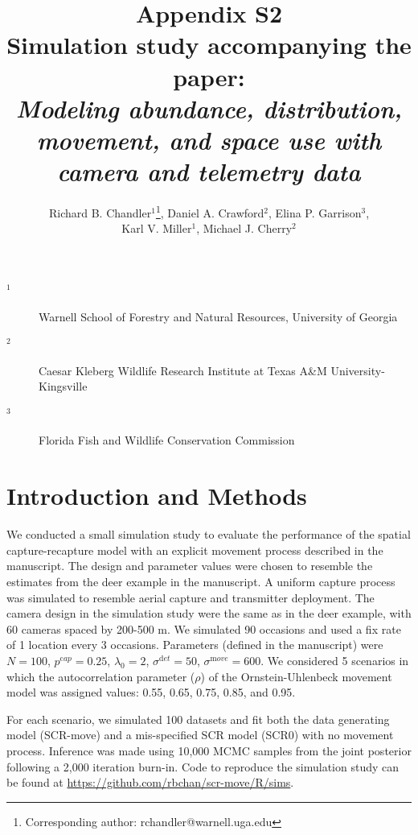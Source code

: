 \documentclass[12pt]{article}
\title{Appendix S2 \\ Simulation study accompanying the paper: \\ \it Modeling abundance, distribution, movement, and space
  use with camera and telemetry data}
\author{Richard B. Chandler$^1$\footnote{Corresponding author: rchandler@warnell.uga.edu}, Daniel A. Crawford$^2$, Elina P. Garrison$^3$, \\
  Karl V. Miller$^1$, Michael J. Cherry$^2$}
\begin{document}
\maketitle

\vspace{12pt}

\begin{description}%
\item[$^1$] Warnell School of Forestry and Natural Resources, University of Georgia %
\item[$^2$] Caesar Kleberg Wildlife Research Institute at Texas A\&M University-Kingsville %
\item[$^3$] Florida Fish and Wildlife Conservation Commission %
\end{description}

\clearpage

\section*{Introduction and Methods}

We conducted a small simulation study to evaluate the performance of the
spatial capture-recapture model with an explicit movement process
described in the manuscript.
The design and parameter values were chosen to resemble the estimates
from the deer example in the manuscript. A uniform capture process was
simulated to resemble aerial capture and transmitter
deployment. The camera design in the simulation study were the same as
in the deer example, with 60 cameras spaced by 200-500 m. We simulated
90 occasions and used a fix rate of 1 location every 3
occasions. Parameters (defined in the manuscript) were $N=100$,
$p^{\mathrm cap}=0.25$, $\lambda_0=2$, $\sigma^{\mathrm det}=50$,
$\sigma^{\mathrm move}=600$. We 
considered 5 scenarios in which the autocorrelation parameter ($\rho$)
of the Ornstein-Uhlenbeck movement model was assigned values: 0.55,
0.65, 0.75, 0.85, and 0.95. 

For each scenario, we simulated 100 datasets and fit both
the data generating model (SCR-move) and a mis-specified SCR model
(SCR0) with no movement process. Inference was made using 10,000 MCMC
samples from the joint posterior following a 2,000 iteration
burn-in. Code to reproduce the simulation study can be found at
\url{https://github.com/rbchan/scr-move/R/sims}.
\end{document}
